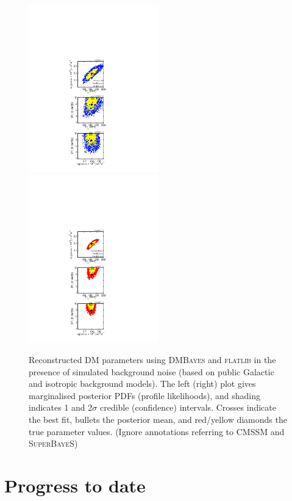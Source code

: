 \documentclass{article}
\begin{document}
\begin{figure}
\includegraphics[trim = 190 0 200 200, clip = true, width=0.5\textwidth]{figs/F2a}
\includegraphics[trim = 190 0 200 200, clip = true, width=0.5\textwidth]{figs/F2b}
\caption{Reconstructed DM parameters using \protect\textsc{DMBayes} and \protect\textsc{flatlib} in the presence of simulated background noise (based on public Galactic and isotropic background models).  The left (right) plot gives marginalised posterior PDFs (profile likelihoods), and shading indicates 1 and 2$\sigma$ credible (confidence) intervals.  Crosses indicate the best fit, bullets the posterior mean, and red/yellow diamonds the true parameter values. (Ignore annotations referring to CMSSM and \textsc{SuperBayeS})}
\label{withBG}
\end{figure}

\section{Progress to date}
\end{document}
